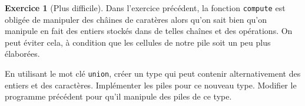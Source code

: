 \documentclass[french,a4paper]{article}
\theoremstyle{definition}
\newtheorem{exercise}{Exercice}
\theoremstyle{remark}
\newcommand{\inlinec}[1]{\lstinline[style=C]°#1°}
\begin{document}
\begin{exercise}[Plus difficile]
  Dans l'exercice précédent, la fonction \inlinec{compute} est obligée
  de manipuler des châines de caratères alors qu'on sait bien qu'on
  manipule en fait des entiers stockés dans de telles chaînes et des
  opérations. On peut éviter cela, à condition que les cellules de
  notre pile soit un peu plus élaborées.

  En utilisant le mot clé \inlinec{union}, créer un type qui peut
  contenir alternativement des entiers et des caractères. Implémenter
  les piles pour ce nouveau type. Modifier le programme précédent pour
  qu'il manipule des piles de ce type.
\end{exercise}
\end{document}
